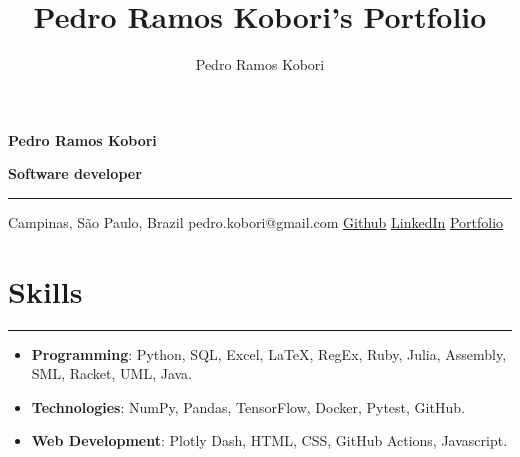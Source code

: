 \documentclass[a4paper,10pt]{article}
\title{Pedro Ramos Kobori's Portfolio}
\newcommand{\ulink}[2]{\href{#1}{\underline{#2}}}
\begin{document}
\date{}
\author{Pedro Ramos Kobori}

\noindent
\begin{minipage}[t]{0.5\textwidth}
  \begin{flushleft}
    \textbf{\Large Pedro Ramos Kobori}
  \end{flushleft}
\end{minipage}
\begin{minipage}[t]{0.5\textwidth}
  \begin{flushright}
    \textbf{\Large Software developer}
  \end{flushright}
\end{minipage}

\hrule

\vspace{2mm}
\noindent
{
  \centering
  Campinas, São Paulo, Brazil \textbar{}
  pedro.kobori@gmail.com \textbar{}
  \ulink{https://github.com/rokobo}{Github} \textbar{}
  \ulink{https://www.linkedin.com/in/pedrokobori/}{LinkedIn} \textbar{}
  \ulink{https://rokobo.github.io}{Portfolio}
  \par
}

\section*{Skills}
\hrule
\vspace{2mm}
\begin{itemize}[itemsep=0pt]
  \item \textbf{Programming}: Python, SQL, Excel, LaTeX, RegEx, Ruby, Julia, Assembly, SML, Racket, UML, Java.
  \item \textbf{Technologies}: NumPy, Pandas, TensorFlow, Docker, Pytest, GitHub.
  \item \textbf{Web Development}: Plotly Dash, HTML, CSS, GitHub Actions, Javascript.
\end{itemize}
\end{document}
